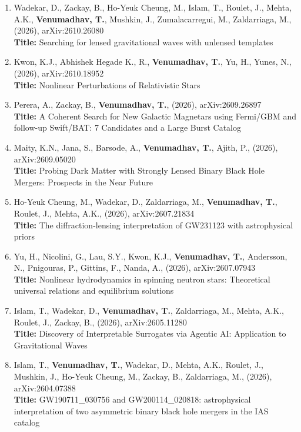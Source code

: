\documentclass{article}
\begin{document}
{\addtolength{\leftskip}{10mm}
\begin{enumerate}[leftmargin=*,itemsep=0.45em,topsep=0.35em]
\item Wadekar, D., Zackay, B., Ho-Yeuk Cheung, M., Islam, T., Roulet, J., Mehta, A.K., \textbf{Venumadhav, T.}, Mushkin, J., Zumalacarregui, M., Zaldarriaga, M., (2026), arXiv:2610.26080 \\
\textbf{Title:} Searching for lensed gravitational waves with unlensed templates
\item Kwon, K.J., Abhishek Hegade K., R., \textbf{Venumadhav, T.}, Yu, H., Yunes, N., (2026), arXiv:2610.18952 \\
\textbf{Title:} Nonlinear Perturbations of Relativistic Stars
\item Perera, A., Zackay, B., \textbf{Venumadhav, T.}, (2026), arXiv:2609.26897 \\
\textbf{Title:} A Coherent Search for New Galactic Magnetars using Fermi/GBM and follow-up Swift/BAT: 7 Candidates and a Large Burst Catalog
\item Maity, K.N., Jana, S., Barsode, A., \textbf{Venumadhav, T.}, Ajith, P., (2026), arXiv:2609.05020 \\
\textbf{Title:} Probing Dark Matter with Strongly Lensed Binary Black Hole Mergers: Prospects in the Near Future
\item Ho-Yeuk Cheung, M., Wadekar, D., Zaldarriaga, M., \textbf{Venumadhav, T.}, Roulet, J., Mehta, A.K., (2026), arXiv:2607.21834 \\
\textbf{Title:} The diffraction-lensing interpretation of GW231123 with astrophysical priors
\item Yu, H., Nicolini, G., Lau, S.Y., Kwon, K.J., \textbf{Venumadhav, T.}, Andersson, N., Pnigouras, P., Gittins, F., Nanda, A., (2026), arXiv:2607.07943 \\
\textbf{Title:} Nonlinear hydrodynamics in spinning neutron stars: Theoretical universal relations and equilibrium solutions
\item Islam, T., Wadekar, D., \textbf{Venumadhav, T.}, Zaldarriaga, M., Mehta, A.K., Roulet, J., Zackay, B., (2026), arXiv:2605.11280 \\
\textbf{Title:} Discovery of Interpretable Surrogates via Agentic AI: Application to Gravitational Waves
\item Islam, T., \textbf{Venumadhav, T.}, Wadekar, D., Mehta, A.K., Roulet, J., Mushkin, J., Ho-Yeuk Cheung, M., Zackay, B., Zaldarriaga, M., (2026), arXiv:2604.07388 \\
\textbf{Title:} GW190711\_030756 and GW200114\_020818: astrophysical interpretation of two asymmetric binary black hole mergers in the IAS catalog

\end{enumerate}}
\end{document}
